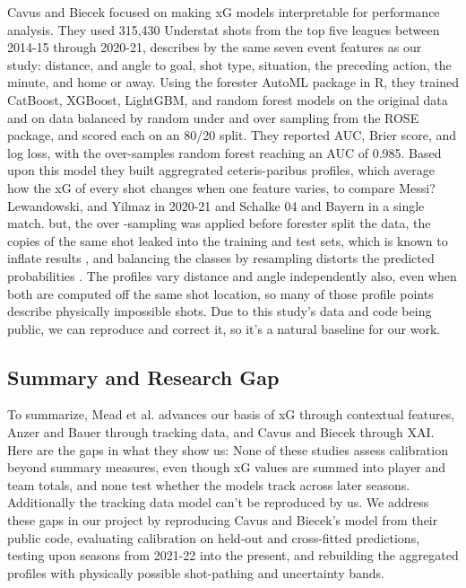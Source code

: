 \documentclass[conference]{IEEEtran}
\begin{document}
Cavus and Biecek \cite{mead2023} focused on making xG models interpretable for performance analysis. They used 315,430 Understat shots from the top five leagues between 2014-15 through 2020-21, describes by the same seven event features as our study: distance, and angle to goal, shot type, situation, the preceding action, the minute, and home or away. Using the forester AutoML package in R, they trained CatBoost, XGBoost, LightGBM, and random forest models on the original data and on data balanced by random under and over sampling from the ROSE package, and scored each on an 80/20 split. They reported AUC, Brier score, and log loss, with the over-samples random forest reaching an AUC of 0.985. Based upon this model they built aggregrated ceteris-paribus profiles, which average how the xG of every shot changes when one feature varies, to compare Messi? Lewandowski, and Yilmaz in 2020-21 and Schalke 04 and Bayern in a single match. but, the over -sampling was applied before forester split the data, the copies of the same shot leaked into the training and test sets, which is known to inflate results \cite{kapoor2023}, and balancing the classes by resampling distorts the predicted probabilities \cite{goorbergh2022}. The profiles vary distance and angle independently also, even when both are computed off the same shot location, so many of those profile points describe physically impossible shots. Due to this study's data and code being public, we can reproduce and correct it, so it's a natural baseline for our work.

\subsection{Summary and Research Gap}

To summarize, Mead et al. \cite{mead2023} advances our basis of xG through contextual features, Anzer and Bauer \cite{anzer2021} through tracking data, and Cavus and Biecek \cite{cavus2022} through XAI. Here are the gaps in what they show us: None of these studies assess calibration beyond summary measures, even though xG values are summed into player and team totals, and none test whether the models track across later seasons. Additionally the tracking data model can't be reproduced by us. We address these gaps in our project by reproducing Cavus and Biecek's model from their public code, evaluating calibration on held-out and cross-fitted predictions, testing upon seasons from 2021-22 into the present, and rebuilding the aggregated profiles with physically possible shot-pathing and uncertainty bands.
\end{document}
